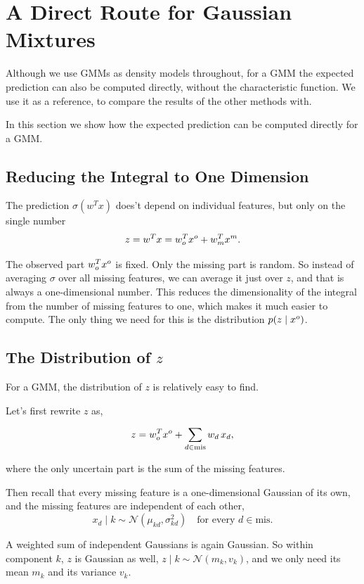 
\section{A Direct Route for Gaussian Mixtures}
\label{subsec:gmm-direct}

Although we use GMMs as density models throughout, for a GMM the expected prediction
can also be computed directly, without the characteristic function. We use it as a reference,
to compare the results of the other methods with.

In this section we show how the expected prediction can be computed directly for a GMM.

\subsection{Reducing the Integral to One Dimension}

The prediction $\sigma(w^T x)$ does't depend on individual features, but only
on the single number
\[
  z = w^T x = w_o^T x^o + w_m^T x^m.
\]

The observed part $w_o^T x^o$ is fixed. Only the missing part is random. So
instead of averaging $\sigma$ over all missing features, we can average it just over
$z$, and that is always a one-dimensional number.
This reduces the dimensionality of the integral from the number of missing
features to one, which makes it much easier to compute.
The only thing we need for this is the distribution $p(z \mid x^o)$.

\subsection{The Distribution of $z$}

For a GMM, the distribution of $z$ is relatively easy to find. 

Let's first rewrite $z$ as,

\[
  z = w_o^T x^o + \sum_{d \in \mathrm{mis}} w_d\, x_d,
\]

where the only uncertain part is the sum of the missing features.

Then recall that every missing feature is a one-dimensional Gaussian of its own, and the missing
features are independent of each other,
\[
  x_d \mid k \sim \mathcal{N}(\mu_{kd}, \sigma_{kd}^2) \quad \text{for every } d \in \mathrm{mis}.
\]

A weighted sum of independent Gaussians is again Gaussian. So within component $k$, $z$ is Gaussian as well,
$z \mid k \sim \mathcal{N}(m_k, v_k)$, and we only need its mean $m_k$ and its
variance $v_k$.

